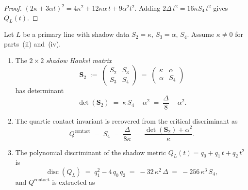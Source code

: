 \begin{proof}
$(2\kappa + 3\alpha t)^2 = 4\kappa^2 + 12\kappa\alpha\,t
+ 9\alpha^2 t^2$.  Adding $2\Delta\,t^2 = 16\kappa S_4\,t^2$
gives $Q_L(t)$.
\end{proof}

\begin{proposition}
\label{prop:hankel-extraction}
\ClaimStatusProvedHere
{}
Let $L$ be a primary line with shadow data
$S_2 = \kappa$, $S_3 = \alpha$, $S_4$.
Assume $\kappa \neq 0$ for parts~\textup{(ii)} and~\textup{(iv)}.
\begin{enumerate}[label=\textup{(\roman*)}]
\item
The $2 \times 2$ \emph{shadow Hankel matrix}
\begin{equation}\label{eq:shadow-hankel}
  \mathbf{S}_2
  \;:=\;
  \begin{pmatrix}
    S_2 & S_3 \\
    S_3 & S_4
  \end{pmatrix}
  \;=\;
  \begin{pmatrix}
    \kappa & \alpha \\
    \alpha & S_4
  \end{pmatrix}
\end{equation}
has determinant
\begin{equation}\label{eq:shadow-hankel-det}
  \det(\mathbf{S}_2)
  \;=\;
  \kappa\,S_4 - \alpha^2
  \;=\;
  \frac{\Delta}{8} - \alpha^2.
\end{equation}
\item
The quartic contact invariant is recovered from
the critical discriminant as
\begin{equation}\label{eq:contact-from-delta}
  Q^{\mathrm{contact}}
  \;=\;
  S_4
  \;=\;
  \frac{\Delta}{8\kappa}
  \;=\;
  \frac{\det(\mathbf{S}_2) + \alpha^2}{\kappa}.
\end{equation}
\item
The polynomial discriminant of the shadow metric
$Q_L(t) = q_0 + q_1\,t + q_2\,t^2$ is
\begin{equation}\label{eq:shadow-metric-discriminant}
  \operatorname{disc}(Q_L)
  \;=\;
  q_1^2 - 4\,q_0\,q_2
  \;=\;
  -32\,\kappa^2\,\Delta
  \;=\;
  -256\,\kappa^3\,S_4,
\end{equation}
and $Q^{\mathrm{contact}}$ is extracted as
\begin{equation}\label{eq:contact-from-disc}

\end{equation}
\end{enumerate}
\end{proposition}
